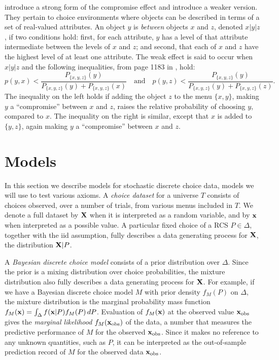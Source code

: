 \documentclass[11pt,letter]{article}
\newcommand{\menu}{menu}
\newcommand{\menus}{menus}
\begin{document}
 introduce a strong form of the compromise effect and  introduce a weaker version.
They pertain to choice environments where objects can be described in terms of a set of real-valued attributes.
An object $y$ is {\em between} objects $x$ and $z$, denoted $x|y|z$, if two conditions hold: first, for each attribute, $y$ has a level of that attribute intermediate between the levels of $x$ and $z$; and second, that each of $x$ and $z$ have the highest level of at least one attribute.
The weak effect is said to occur when $x|y|z$ and the following inequalities, from page 1183 in , hold:
\[
	p(y,x) < \frac{P_{\{x,y,z\}}(y)}{P_{\{x,y,z\}}(y) + P_{\{x,y,z\}}(x)}
	\quad \mbox{and} \quad
	p(y,z) < \frac{P_{\{x,y,z\}}(y)}{P_{\{x,y,z\}}(y) + P_{\{x,y,z\}}(z)}.
\]
The inequality on the left holds if adding the object $z$ to the \menu{} $\{x,y\}$, making $y$ a ``compromise'' between $x$ and $z$, raises the relative probability of choosing $y$, compared to $x$.
The inequality on the right is similar, except that $x$ is added to $\{y,z\}$, again making $y$ a ``compromise'' between $x$ and $z$.

\section{Models}\label{s:models}

In this section we describe models for stochastic discrete choice data, models we will use to test various axioms.
A {\em choice dataset} for a universe $T$ consists of choices observed, over a number of trials, from various \menus{} included in $T$.
We denote a full dataset by $\bf{X}$ when it is interpreted as a random variable, and by $\bf{x}$ when interpreted as a possible value.
A particular fixed choice of a RCS $P \in \Delta$, together with the iid assumption, fully describes a data generating process for $\bf{X}$, the distribution ${\bf X}|P$.

A {\em Bayesian discrete choice model} consists of a prior distribution over $\Delta$.
Since the prior is a mixing distribution over choice probabilities, the mixture distribution also fully describes a data generating process for ${\bf X}$.
For example, if we have a Bayesian discrete choice model $M$ with prior density $f_M(P)$ on $\Delta$, the mixture distribution is the marginal probability mass function $f_M({\bf x}) = \int_\Delta f({\bf x}|P) f_M(P) \,dP$.
Evaluation of $f_M({\bf x})$ at the observed value ${\bf x}_{\mathrm{obs}}$ gives the {\em marginal likelihood} $f_M({\bf x}_{\mathrm{obs}})$ of the data, a number that measures the predictive performance of $M$ for the observed ${\bf x}_{\mathrm{obs}}$.
Since it makes no reference to any unknown quantities, such as $P$, it can be interpreted as the out-of-sample prediction record of $M$ for the observed data ${\bf x}_{\mathrm{obs}}$.
\end{document}
